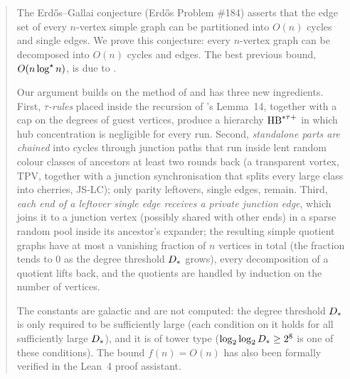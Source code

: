 \maketitle

\begin{abstract}
The Erd\H{o}s--Gallai conjecture (Erd\H{o}s Problem \#184) asserts that the edge
set of every $n$-vertex simple graph can be partitioned into $O(n)$ cycles and
single edges. We prove this conjecture: every $n$-vertex graph can be
decomposed into $O(n)$ cycles and edges. The best previous bound, $O(n\logs
n)$, is due to \BMnames{} \cite{BM}.

Our argument builds on the method of \cite{BM} and has three new ingredients.
First, \emph{$\tau$-rules} placed inside the recursion of \BMnames's Lemma~14,
together with a cap on the degrees of guest vertices, produce a hierarchy $\HBtp$
in which hub concentration is negligible for every run. Second, \emph{standalone
parts are chained} into cycles through junction paths that run inside lent
random colour classes of ancestors at least two rounds back (a transparent
vortex, TPV, together with a junction synchronisation that splits every large
class into cherries, JS-LC); only parity leftovers, single edges, remain. Third,
\emph{each end of a leftover single edge receives a private junction edge}, which
joins it to a junction vertex (possibly shared with other ends) in a sparse
random pool inside its ancestor's expander; the resulting simple quotient graphs
have at most a vanishing fraction of $n$ vertices in total (the fraction tends to
$0$ as the degree threshold $\Dstar$ grows), every decomposition of a quotient
lifts back, and the quotients are handled by induction on the number of
vertices.

The constants are galactic and are not computed: the degree threshold $\Dstar$ is
only required to be sufficiently large (each condition on it holds for all
sufficiently large $\Dstar$), and it is of tower type ($\log_2\log_2\Dstar\ge2^8$
is one of these conditions). The bound $f(n)=O(n)$ has also been formally verified in the
Lean~4 proof assistant.
\end{abstract}
